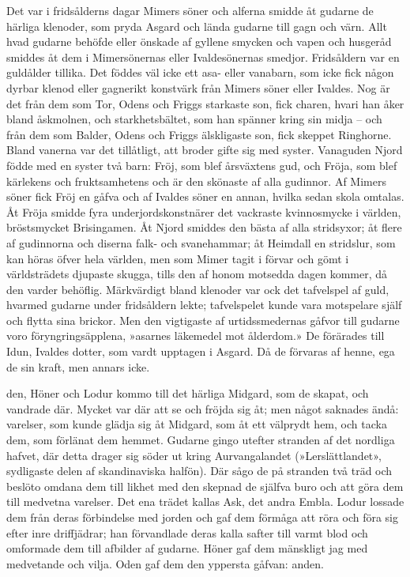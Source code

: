 Det var i fridsålderns dagar Mimers söner och alferna smidde åt gudarne
de härliga klenoder, som pryda Asgard och lända gudarne till gagn och
värn. Allt hvad gudarne behöfde eller önskade af gyllene smycken och
vapen och husgeråd smiddes åt dem i Mimersönernas eller Ivaldesönernas
smedjor. Fridsåldern var en guldålder tillika. Det föddes väl icke ett
asa- eller vanabarn, som icke fick någon dyrbar klenod eller gagnerikt
konstvärk från Mimers söner eller Ivaldes. Nog är det från dem som Tor,
Odens och Friggs starkaste son, fick charen, hvari han åker bland
åskmolnen, och starkhetsbältet, som han spänner kring sin midja -- och
från dem som Balder, Odens och Friggs älskligaste son, fick skeppet
Ringhorne. Bland vanerna var det tillåtligt, att broder gifte sig med
syster. Vanaguden Njord födde med en syster två barn: Fröj, som blef
årsväxtens gud, och Fröja, som blef kärlekens och fruktsamhetens och är
den skönaste af alla gudinnor. Af Mimers söner fick Fröj en
gåfva och af Ivaldes söner en annan, hvilka sedan skola omtalas. Åt
Fröja smidde fyra underjordskonstnärer det vackraste kvinnosmycke i
världen, bröstsmycket Brisingamen. Åt Njord smiddes den bästa af alla
stridsyxor; åt flere af gudinnorna och diserna falk- och svanehammar; åt
Heimdall en stridslur, som kan höras öfver hela världen, men som Mimer
tagit i förvar och gömt i världsträdets djupaste skugga, tills den af
honom motsedda dagen kommer, då den varder behöflig. Märkvärdigt bland
klenoder var ock det tafvelspel af guld, hvarmed gudarne under
fridsåldern lekte; tafvelspelet kunde vara motspelare själf och flytta
sina brickor. Men den vigtigaste af urtidssmedernas gåfvor till gudarne
voro föryngringsäpplena, »asarnes läkemedel mot ålderdom.» De förärades
till Idun, Ivaldes dotter, som vardt upptagen i Asgard. Då de förvaras
af henne, ega de sin kraft, men annars icke.

\endSecII


\dropcapO den, Höner och Lodur kommo till det härliga Mid\-gard, som de skapat, och
vandrade där. Mycket var där att se och fröjda sig åt; men något
saknades ändå: varelser, som kunde glädja sig åt Midgard, som åt ett
välprydt hem, och tacka dem, som förlänat dem hemmet. Gudarne gingo
utefter stranden af det nordliga hafvet, där detta drager sig söder ut
kring Aurvangalandet (»Lerslättlandet», sydligaste delen af
skandinaviska halfön). Där sågo de på stranden två träd och beslöto
omdana dem till likhet med den skepnad de själfva buro och att göra dem
till medvetna varelser. Det ena trädet kallas Ask, det andra Embla.
Lodur lossade dem från deras förbindelse med jorden och gaf dem förmåga
att röra och föra sig efter inre driffjädrar; han förvandlade deras
kalla safter till varmt blod och omformade dem till afbilder af gudarne.
Höner gaf dem mänskligt jag med medvetande och vilja. Oden gaf dem den
yppersta gåfvan: anden.


